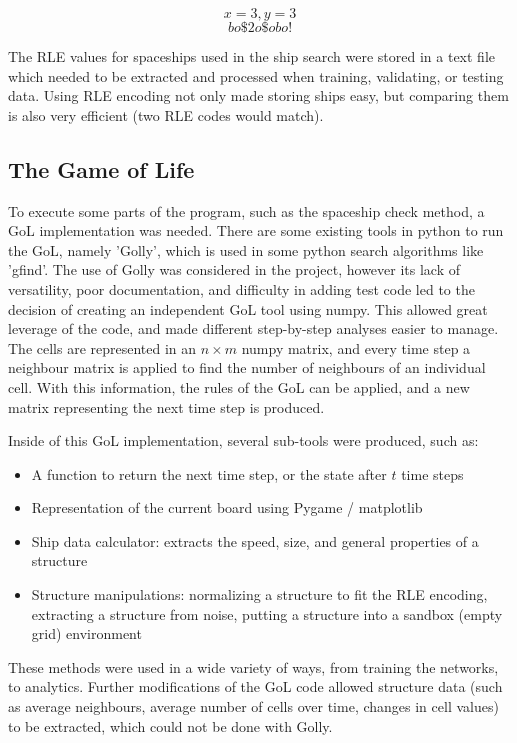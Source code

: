 \documentclass{l4proj}
\begin{document}
\[ x=3,y=3 \]
\[ bo\$2o\$obo! \]

The RLE values for spaceships used in the ship search were stored in a text file which needed to be extracted and processed when training, validating, or testing data. Using RLE encoding not only made storing ships easy, but comparing them is also very efficient (two RLE codes would match).

\subsection{The Game of Life}

To execute some parts of the program, such as the spaceship check method, a GoL implementation was needed. There are some existing tools in python to run the GoL, namely 'Golly', which is used in some python search algorithms like 'gfind'. The use of Golly was considered in the project, however its lack of versatility, poor documentation, and difficulty in adding test code led to the decision of creating an independent GoL tool using numpy. This allowed great leverage of the code, and made different step-by-step analyses easier to manage. The cells are represented in an $n \times m$ numpy matrix, and every time step a neighbour matrix is applied to find the number of neighbours of an individual cell. With this information, the rules of the GoL can be applied, and a new matrix representing the next time step is produced. 

Inside of this GoL implementation, several sub-tools were produced, such as:
\begin{itemize}
    \item A function to return the next time step, or the state after $t$ time steps 
    \item Representation of the current board using Pygame / matplotlib
    \item Ship data calculator: extracts the speed, size, and general properties of a structure
    \item Structure manipulations: normalizing a structure to fit the RLE encoding, extracting a structure from noise, putting a structure into a sandbox (empty grid) environment
\end{itemize}

These methods were used in a wide variety of ways, from training the networks, to analytics. Further modifications of the GoL code allowed structure data (such as average neighbours, average number of cells over time, changes in cell values) to be extracted, which could not be done with Golly. 
\end{document}

